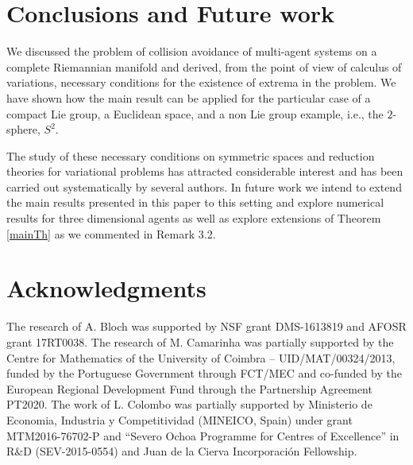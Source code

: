 \documentclass[letterpaper, 10 pt, conference]{ieeeconf}  %
\begin{document}
\section{Conclusions and Future work}\label{lastsection}
We discussed the problem of collision avoidance of multi-agent systems on a complete Riemannian manifold and derived, from the point of view of calculus of variations, necessary conditions for the existence of extrema in the problem. We have shown how the main result can be applied for the particular case of a compact Lie group, a Euclidean space, and a non Lie group example, i.e., the $2$-sphere, $S^{2}$.

The study of these necessary conditions on symmetric spaces and reduction theories for variational problems has attracted considerable interest and has been carried out systematically by several authors. In future work we intend to extend the main results presented in this paper to this setting and explore numerical results for three dimensional agents as well as  explore extensions of Theorem \ref{mainTh} as we commented in Remark 3.2.
%
%
\section{Acknowledgments}
The research of A. Bloch was supported by NSF grant DMS-1613819 and AFOSR grant 17RT0038. The research of M. Camarinha was partially supported by the Centre for Mathematics of the University of Coimbra -- UID/MAT/00324/2013, funded by the Portuguese Government through FCT/MEC and co-funded by the European Regional Development Fund through the Partnership Agreement PT2020. The work of L. Colombo was partially supported by Ministerio de Economia, Industria y Competitividad (MINEICO, Spain) under grant MTM2016-76702-P and ``Severo Ochoa Programme for Centres of Excellence'' in R$\&$D (SEV-2015-0554) and Juan de la Cierva Incorporaci\'on Fellowship.  
\end{document}
